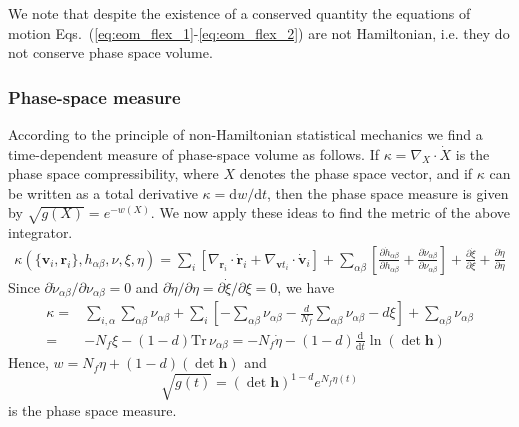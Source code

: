 \documentclass[12pt,letter]{article}
\renewcommand{\vec}[1]{\mathbf{#1}}
\begin{document}
We note that despite the existence of a conserved quantity the equations
of motion Eqs.~(\ref{eq:eom_flex_1}-\ref{eq:eom_flex_2})
are not Hamiltonian, i.e. they do not conserve phase space volume.

\subsubsection{Phase-space measure}
\label{sec:measure}
According to the principle of non-Hamiltonian statistical mechanics
\cite{Tuckerman2000} we find a time-dependent measure of phase-space
volume as follows. If $\kappa = \nabla_X \cdot \dot X$ is the phase space
compressibility, where $X$ denotes the phase space vector, and if $\kappa$
 can be written as a total derivative $\kappa = \mathrm{d}w/\mathrm{d}t$,
then the phase space measure is given by $\sqrt{g(X)}=e^{-w(X)}$.
We now apply these ideas to find the metric of the above integrator.
\begin{align}
\kappa(\{\vec v_i,\vec r_i\}, h_{\alpha\beta},\nu,\xi,\eta) = \sum_i \left[\nabla_{\vec r_i} \cdot \dot{\vec r}_i +
\nabla_{\vec vt_i} \cdot \dot{\vec v}_i\right]
+ \sum_{\alpha\beta} \left[\frac{\partial{\dot{h}_{\alpha\beta}}}{\partial h_{\alpha\beta}} +
\frac{\partial \dot{\nu}_{\alpha\beta}}{\partial \nu_{\alpha\beta}} \right]
+ \frac{\partial \dot{\xi}}{\partial \xi} +
\frac{\partial \dot{\eta}}{\partial \eta}\label{eq:measure}
\end{align}
Since $\partial \dot\nu_{\alpha\beta}/\partial \nu_{\alpha\beta} = 0$ and $\partial
\dot\eta/\partial\eta =\partial \dot \xi/\partial\xi=0$, we have
\begin{align}
\kappa =&  \sum_{i, \alpha}\sum_{\alpha\beta}\nu_{\alpha\beta} + \sum_i \left[-\sum_{\alpha\beta} \nu_{\alpha\beta} - \frac{d}{N_f} \sum_{\alpha\beta} \nu_{\alpha	\beta} - d \xi\right] + \sum_{\alpha\beta} \nu_{\alpha\beta}\\
=&-N_f \xi - (1-d) \mathrm{Tr}\,\nu_{\alpha \beta}= -N_f \dot \eta - (1-d)\frac{\mathrm{d}}{\mathrm{d}t}\ln(\det\vec h)
\end{align}
Hence, $w=N_f \eta+(1-d) (\det\vec h)$ and
\begin{equation}
\sqrt{g(t)}=(\det \vec h)^{1-d} e^{N_f \eta(t)}
\label{eq:measure_npt}
\end{equation}
 is the phase space measure.
\end{document}
